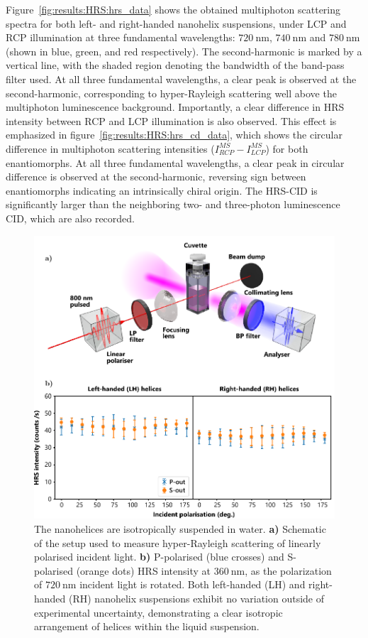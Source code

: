 Figure~\ref{fig:results:HRS:hrs_data} shows the obtained multiphoton scattering spectra for both left- and right-handed nanohelix suspensions, under LCP and RCP illumination at three fundamental wavelengths: $\SI{720}{\nano\m}$, $\SI{740}{\nano\m}$ and $\SI{780}{\nano\m}$ (shown in blue, green, and red respectively). 
The second-harmonic is marked by a vertical line, with the shaded region denoting the bandwidth of the band-pass filter used. At all three fundamental wavelengths, a clear peak is observed at the second-harmonic, corresponding to hyper-Rayleigh scattering well above the multiphoton luminescence background. Importantly, a clear difference in HRS intensity between RCP and LCP illumination is also observed. 
This effect is emphasized in figure~\ref{fig:results:HRS:hrs_cd_data}, which shows the circular difference in multiphoton scattering intensities ($I_{RCP}^{MS}-I_{LCP}^{MS}$) for both enantiomorphs. At all three fundamental wavelengths, a clear peak in circular difference is observed at the second-harmonic, reversing sign between enantiomorphs indicating an intrinsically chiral origin. The HRS-CID is significantly larger than the neighboring two- and three-photon luminescence CID, which are also recorded. 

\begin{figure}[htb!]	
    \centering	
    \includegraphics[scale=1]{./figures/results/HRS/hrs_linpol_data.pdf}
    \caption{\label{fig:results:HRS:hrs_linpol_data}
    The nanohelices are isotropically suspended in water. \textbf{a)} Schematic of the setup used to measure hyper-Rayleigh scattering of linearly polarised incident light. \textbf{b)} P-polarised (blue crosses) and S-polarised (orange dots) HRS intensity at $\SI{360}{\nano\m}$, as the polarization of $\SI{720}{\nano\m}$ incident light is rotated. Both left-handed (LH) and right-handed (RH) nanohelix suspensions exhibit no variation outside of experimental uncertainty, demonstrating a clear isotropic arrangement of helices within the liquid suspension.}	
\end{figure}

